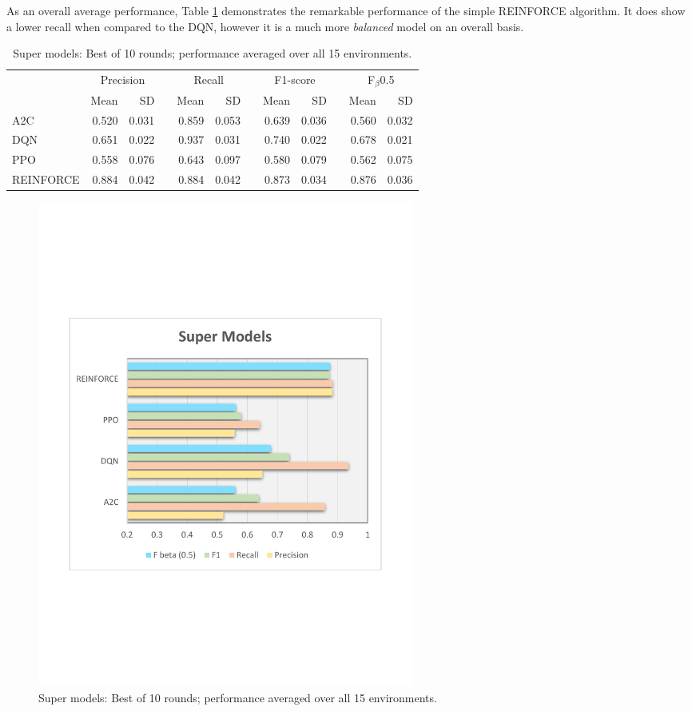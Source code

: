 \documentclass[a4paper, 12pt]{article}
\newcommand{\rowspace}[1]{\renewcommand{\arraystretch}{#1}}
\begin{document}
As an overall average performance, Table \ref{tbl:supermodels} demonstrates the remarkable performance of the simple REINFORCE algorithm. It does show a lower recall when compared to the DQN, however it is a much more \textit{balanced} model on an overall basis.
\begin{table}[h]\centering
	\sffamily
	\rowspace{1.3}
	\begin{tabular}{@{}l rr c rr c rr c rr@{}}
		\arrayrulecolor{black!40}\toprule
		& \multicolumn{2}{c}{Precision} & \phantom{i} & \multicolumn{2}{c}{Recall} & \phantom{i} & \multicolumn{2}{c}{F1-score} & \phantom{i} & \multicolumn{2}{c}{F$_\beta$0.5} \\
		\cmidrule{2-3} \cmidrule{5-6} \cmidrule{8-9} \cmidrule{11-12} 
		
		&Mean &SD & &Mean &SD & &Mean &SD& &Mean & SD\\ \midrule
		A2C & 0.520 & 0.031 & &0.859 & 0.053 & & 0.639 & 0.036 & &0.560 &0.032 \\
		DQN & 0.651 & 0.022 & &0.937 & 0.031 & & 0.740 & 0.022 & &0.678 &0.021 \\
		PPO & 0.558 & 0.076 & &0.643 & 0.097 & & 0.580 & 0.079 & &0.562 &0.075 \\
		REINFORCE & \textcolor{dblue}{0.884} & 0.042 & &\textcolor{dblue}{0.884} & 0.042 & & \textcolor{dblue}{0.873} & 0.034 & &\textcolor{dblue}{0.876} &0.036 \\
		\bottomrule
	\end{tabular}
	\caption{Super models: Best of 10 rounds; performance averaged over all 15 environments.}
	\label{tbl:supermodels}
\end{table}
\begin{figure}[!htbp]
	\centering
	\includegraphics[width=0.6\textwidth, trim={1.5cm 7cm 1cm 7cm}]{images/SuperModelsPlot.pdf}  
	\caption{Super models: Best of 10 rounds; performance averaged over all 15 environments.}
	\label{fig:supermodels}
\end{figure}
\end{document}
